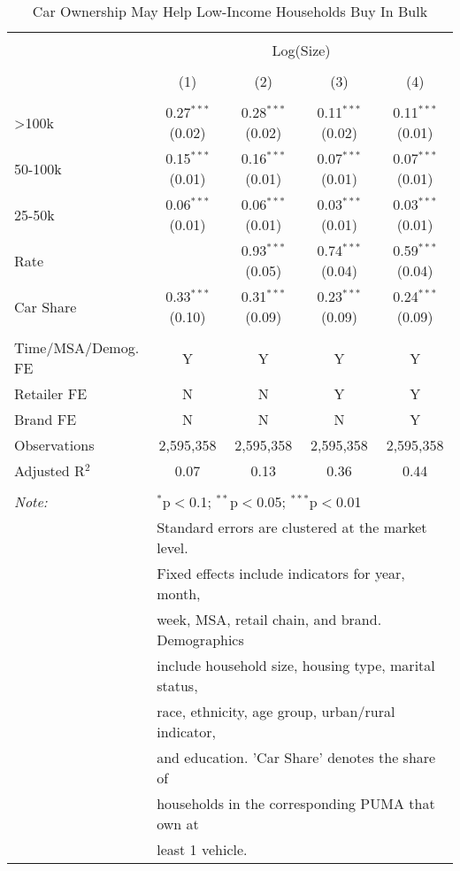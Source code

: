 
\begin{table}[!htbp] \centering 
  \caption{Car Ownership May Help Low-Income Households Buy In Bulk} 
  \label{tab:packageSizeFullTpCar} 
\begin{tabular}{@{\extracolsep{5pt}}lcccc} 
\\[-1.8ex]\hline 
\hline \\[-1.8ex] 
 & \multicolumn{4}{c}{Log(Size)} \\ 
\\[-1.8ex] & (1) & (2) & (3) & (4)\\ 
\hline \\[-1.8ex] 
 >100k & 0.27$^{***}$ (0.02) & 0.28$^{***}$ (0.02) & 0.11$^{***}$ (0.02) & 0.11$^{***}$ (0.01) \\ 
  50-100k & 0.15$^{***}$ (0.01) & 0.16$^{***}$ (0.01) & 0.07$^{***}$ (0.01) & 0.07$^{***}$ (0.01) \\ 
  25-50k & 0.06$^{***}$ (0.01) & 0.06$^{***}$ (0.01) & 0.03$^{***}$ (0.01) & 0.03$^{***}$ (0.01) \\ 
  Rate &  & 0.93$^{***}$ (0.05) & 0.74$^{***}$ (0.04) & 0.59$^{***}$ (0.04) \\ 
  Car Share & 0.33$^{***}$ (0.10) & 0.31$^{***}$ (0.09) & 0.23$^{***}$ (0.09) & 0.24$^{***}$ (0.09) \\ 
 \hline \\[-1.8ex] 
Time/MSA/Demog. FE & Y & Y & Y & Y \\ 
Retailer FE & N & N & Y & Y \\ 
Brand FE & N & N & N & Y \\ 
Observations & 2,595,358 & 2,595,358 & 2,595,358 & 2,595,358 \\ 
Adjusted R$^{2}$ & 0.07 & 0.13 & 0.36 & 0.44 \\ 
\hline 
\hline \\[-1.8ex] 
\textit{Note:}  & \multicolumn{4}{l}{$^{*}$p$<$0.1; $^{**}$p$<$0.05; $^{***}$p$<$0.01} \\ 
 & \multicolumn{4}{l}{Standard errors are clustered at the market level.} \\ 
 & \multicolumn{4}{l}{Fixed effects include indicators for year, month, } \\ 
 & \multicolumn{4}{l}{week, MSA, retail chain, and brand. Demographics } \\ 
 & \multicolumn{4}{l}{include household size, housing type, marital status, } \\ 
 & \multicolumn{4}{l}{race, ethnicity, age group, urban/rural indicator, } \\ 
 & \multicolumn{4}{l}{and education. 'Car Share' denotes the share of } \\ 
 & \multicolumn{4}{l}{households in the corresponding PUMA that own at } \\ 
 & \multicolumn{4}{l}{least 1 vehicle.} \\ 
\end{tabular} 
\end{table} 
